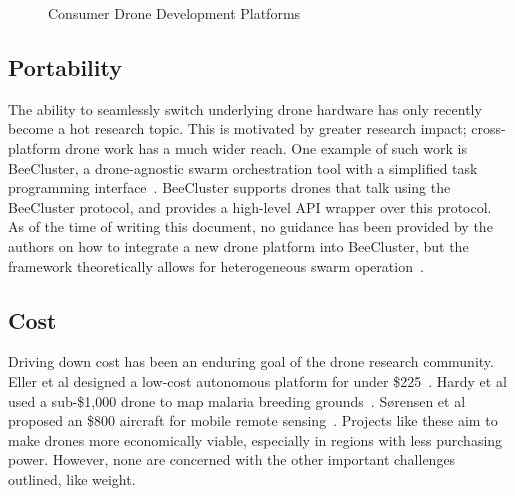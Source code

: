 \begin{figure}
    \centering
    \qquad
    \caption{Consumer Drone Development Platforms}
    \label{fig:drone-dev-platforms}
\end{figure}

\subsection{Portability}
The ability to seamlessly switch underlying drone hardware has only recently become a hot research topic. This is motivated by greater research impact; cross-platform drone work has a much wider reach. One example of such work is BeeCluster, a drone-agnostic swarm orchestration tool with a simplified task programming interface~\cite{He2020}. BeeCluster supports drones that talk using the BeeCluster protocol, and provides a high-level API wrapper over this protocol. As of the time of writing this document, no guidance has been provided by the authors on how to integrate a new drone platform into BeeCluster, but the framework theoretically allows for heterogeneous swarm operation~\cite{BeeCluster}.

\subsection{Cost}
Driving down cost has been an enduring goal of the drone research community. Eller et al designed a low-cost autonomous platform for under \$225~\cite{Eller2019}. Hardy et al used a sub-\$1,000 drone to map malaria breeding grounds~\cite{Hardy2017}. S{\o}rensen et al proposed an \$800 aircraft for mobile remote sensing~\cite{Sorensen2017}. Projects like these aim to make drones more economically viable, especially in regions with less purchasing power. However, none are concerned with the other important challenges outlined, like weight.  

